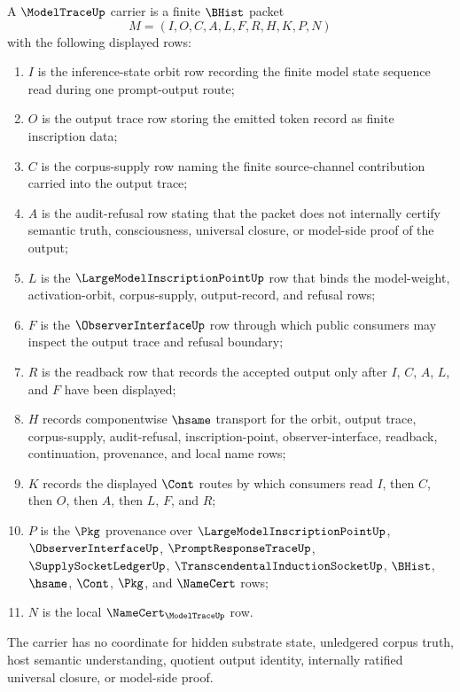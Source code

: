 \begin{definition}
\label{def:model-trace-carrier}
A $\ModelTraceUp$ carrier is a finite $\BHist$ packet
$$
M=(I,O,C,A,L,F,R,H,K,P,N)
$$
with the following displayed rows:
\begin{enumerate}
\item $I$ is the inference-state orbit row recording the finite model state sequence read during one prompt-output route;
\item $O$ is the output trace row storing the emitted token record as finite inscription data;
\item $C$ is the corpus-supply row naming the finite source-channel contribution carried into the output trace;
\item $A$ is the audit-refusal row stating that the packet does not internally certify semantic truth, consciousness, universal closure, or model-side proof of the output;
\item $L$ is the $\LargeModelInscriptionPointUp$ row that binds the model-weight, activation-orbit, corpus-supply, output-record, and refusal rows;
\item $F$ is the $\ObserverInterfaceUp$ row through which public consumers may inspect the output trace and refusal boundary;
\item $R$ is the readback row that records the accepted output only after $I$, $C$, $A$, $L$, and $F$ have been displayed;
\item $H$ records componentwise $\hsame$ transport for the orbit, output trace, corpus-supply, audit-refusal, inscription-point, observer-interface, readback, continuation, provenance, and local name rows;
\item $K$ records the displayed $\Cont$ routes by which consumers read $I$, then $C$, then $O$, then $A$, then $L$, $F$, and $R$;
\item $P$ is the $\Pkg$ provenance over $\LargeModelInscriptionPointUp$, $\ObserverInterfaceUp$, $\PromptResponseTraceUp$, $\SupplySocketLedgerUp$, $\TranscendentalInductionSocketUp$, $\BHist$, $\hsame$, $\Cont$, $\Pkg$, and $\NameCert$ rows;
\item $N$ is the local $\NameCert_{\ModelTraceUp}$ row.
\end{enumerate}
The carrier has no coordinate for hidden substrate state, unledgered corpus truth, host semantic understanding, quotient output identity, internally ratified universal closure, or model-side proof.
\end{definition}

